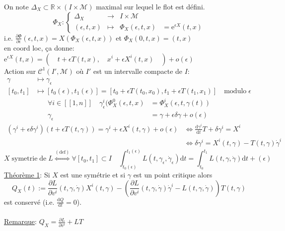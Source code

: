 \documentclass[a4paper,11pt]{article}
\renewcommand{\d}{{\mathrm{d}}}
\newcommand{\e}{{\mathrm{e}}}
\newcommand{\dr}[2]{\frac{\partial {#1}}{\partial{#2}}}
\begin{document}
\noindent On note $\Delta_X\subset \mathbb{R}\times(I\times\mathcal{M})$ maximal sur lequel le flot est défini.
\begin{equation*}
	\Phi_X : \left\{\begin{matrix}
	\Delta_X & \to & I\times\mathcal{M} &\\
	(\epsilon,t,x) & \mapsto & \Phi_X(\epsilon,t,x) &=\e^{\epsilon X}(t,x)
	\end{matrix}\right.
\end{equation*}
i.e. $\frac{\partial \Phi}{\partial \epsilon}(\epsilon, t, x) = X(\Phi_X(\epsilon, t, x))$ et $\Phi_X(0,t,x)=(t,x)$
\\
en coord loc, ça donne: $\e^{\epsilon X}(t,x)=\left(\quad t+\epsilon T(t,x),\quad x^i+\epsilon X^i(t,x)\quad \right) + o(\epsilon)$
\\
Action sur $\mathcal{C}^1(I',\mathcal{M})$ où $I'$ est un intervalle compacte de $I$:
\begin{align*}
\gamma &\mapsto \gamma_\epsilon\\
[t_0,t_1] &\mapsto[t_0(\epsilon),t_1(\epsilon)]=[t_0+\epsilon T(t_0,x_0),t_1+\epsilon T(t_1,x_1)]\quad \mathrm{modulo}\;\epsilon
\end{align*}
\begin{align*}
\forall i \in [\![1,n]\!] \quad \gamma^i_{\epsilon}(\Phi_X^0(\epsilon,t,x) &= \Phi_X^i(\epsilon,t,\gamma(t))\\
\gamma_\epsilon &= \gamma + \epsilon\delta\gamma + o(\epsilon)
\end{align*}
\begin{align*}
(\gamma^i+\epsilon\delta\gamma^i)(t+\epsilon T(t,\gamma)) = \gamma^i + \epsilon X^i(t,\gamma) + o(\epsilon)
&\iff \frac{\d \gamma^i}{\d t}T + \delta\gamma^i = X^i\\
&\iff \boxed{\delta \gamma^i = X^i(t,\gamma) - T(t,\gamma)\dot\gamma^i}
\end{align*}
$$X \; \mathrm{symetrie}\;\mathrm{de}\;L \overset{(\mathrm{def})}{\iff} \forall [t_0,t_1]\subset I \quad \int_{t_0(\epsilon)}^{t_1(\epsilon)} L(t,\gamma_\epsilon, \dot\gamma_\epsilon)\d t = \int_{t_0}^{t_1} L(t,\gamma,\dot\gamma)\d t + (\epsilon)$$
\underline{Théorème 1}: Si $X$ est une symétrie et si $\gamma$ est un point critique alors
$$Q_X(t) := \dr{L}{v^i}(t,\gamma,\dot\gamma)X^i(t,\gamma) - \left(\dr{L}{v^i}(t,\gamma,\dot\gamma)\dot\gamma^i - L(t,\gamma,\dot\gamma)\right)T(t,\gamma)$$
est conservé (i.e. $\frac{\d Q}{\d t}=0$).\\
\\
\underline{Remarque}: $Q_X = \dr{L}{v^i} + LT$\\ \\
\end{document}

